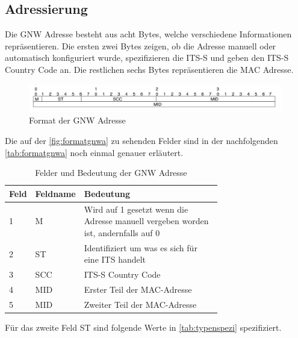 \subsection{Adressierung} 
Die \acl{GNW} Adresse besteht aus acht Bytes, welche verschiedene Informationen repräsentieren. Die ersten zwei Bytes zeigen, ob die Adresse manuell oder automatisch konfiguriert wurde, spezifizieren die \ac{ITS-S} und geben den ITS-S Country Code an. Die restlichen sechs Bytes repräsentieren die MAC Adresse. \cite{etsi302636-4-1}

\begin{figure}
	\includegraphics[width=0.99\textwidth]{content/images/03_networklayer/gnwadress.jpg}
	\caption{Format der \acl{GNW} Adresse}
	\label{fig:formatgnwa}
\end{figure}
Die auf der \autoref{fig:formatgnwa} zu sehenden Felder sind in der nachfolgenden \autoref{tab:formatgnwa} noch einmal genauer erläutert.

\begin{table}[h]
\begin{tabular}{llp{0.7\linewidth}}
\textbf{Feld} & \textbf{Feldname} & \textbf{Bedeutung} \\ \hline
    1 & M       & Wird auf 1 gesetzt wenn die Adresse manuell vergeben worden ist, andernfalls auf 0          \\
    2 & ST    & Identifiziert um was es sich für eine ITS handelt       \\
    3 & SCC   &   ITS-S Country Code        \\
    4 & MID    &    Erster Teil der MAC-Adresse       \\
    5 & MID     &   Zweiter Teil der MAC-Adresse        \\
\end{tabular}
\caption{Felder und Bedeutung der \acs{GNW} Adresse \cite{etsi302636-4-1}}
\label{tab:formatgnwa}
\end{table}

Für das zweite Feld ST sind folgende Werte in \autoref{tab:typenspezi} spezifiziert.

